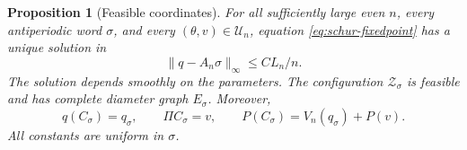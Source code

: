 \documentclass[11pt,reqno]{amsart}
\numberwithin{equation}{section}
\newtheorem{proposition}[theorem]{Proposition}
\theoremstyle{definition}
\theoremstyle{remark}
\newcommand{\norm}[1]{\lVert #1\rVert}
\newcommand{\UU}{\mathscr U_n}
\begin{document}
\begin{proposition}[Feasible coordinates]\label{prop:schur-chart}
For all sufficiently large even $n$, every antiperiodic word $\sigma$, and every $(\theta,v)\in\UU$, equation \eqref{eq:schur-fixedpoint} has a unique solution in
\begin{equation}\label{eq:fiber-q-window}
 \norm{q-A_n\sigma}_\infty\le CL_n/n.
\end{equation}
The solution depends smoothly on the parameters. The configuration $\mathcal Z_\sigma$ is feasible and has complete diameter graph $E_\sigma$. Moreover,
\begin{equation}\label{eq:fiber-schur-identities}
 q(C_\sigma)=q_\sigma,\qquad \Pi C_\sigma=v,\qquad
 P(C_\sigma)=V_n(q_\sigma)+P(v).
\end{equation}
All constants are uniform in $\sigma$.
\end{proposition}
\end{document}
